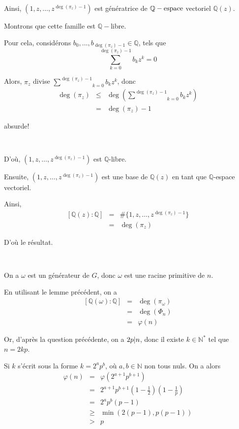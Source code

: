 Ainsi, $(1, z, \ldots, z^{\deg (\pi_z) - 1})$ est g{\'e}n{\'e}ratrice de
$\mathbb{Q}- \operatorname{espace}$ vectoriel $\mathbb{Q} (z)$.

Montrons que cette famille est $\mathbb{Q}-$libre.

Pour cela, consid{\'e}rons $b_0, \ldots, b_{\deg (\pi_z) - 1} \in \mathbb{Q}$,
tels que
\[ \underset{k = 0}{\overset{\deg (\pi_z) - 1}{\sum}} b_k z^k = 0 \]


Alors, $\pi_z$ divise $\underset{k = 0}{\overset{\deg (\pi_z) - 1}{\sum}} b_k
z^k$, donc
\begin{eqnarray*}
  \deg (\pi_z) & \leqslant & \deg \left( \underset{k = 0}{\overset{\deg
  (\pi_z) - 1}{\sum}} b_k z^k \right)\\
  & = & \deg (\pi_z) - 1
\end{eqnarray*}


absurde!

\

D'o{\`u}, $(1, z, \ldots, z^{\deg (\pi_z) - 1})$ est $\mathbb{Q}$-libre.

Ensuite, $(1, z, \ldots, z^{\deg (\pi_z) - 1})$ est une base de $\mathbb{Q}
(z)$ en tant que $\mathbb{Q}$-espace vectoriel.

Ainsi,
\begin{eqnarray*}
  {}[\mathbb{Q} (z) : \mathbb{Q}] & = & \# \{ 1, z, \ldots, z^{\deg (\pi_z) -
  1} \}\\
  & = & \deg (\pi_z)
\end{eqnarray*}


D'o{\`u} le r{\'e}sultat.

\

On a $\omega$ est un g{\'e}n{\'e}rateur de $G$, donc $\omega$ est une racine
primitive de $n$.

En utilisant le lemme pr{\'e}c{\'e}dent, on a
\begin{eqnarray*}
  {}[\mathbb{Q} (\omega) : \mathbb{Q}] & = & \deg (\pi_{\omega})\\
  & = & \deg (\Phi_n)\\
  & = & \varphi (n)
\end{eqnarray*}


Or, d'apr{\`e}s la question pr{\'e}c{\'e}dente, on a $2 p | n $,
donc il existe $k \in \mathbb{N}^{\ast}$ tel que $n = 2 k p$.

Si $k$ s'{\'e}crit sous la forme $k = 2^a p^b$, o{\`u} $a, b \in \mathbb{N}$
non tous nuls. On a alors
\begin{eqnarray*}
  \varphi (n) & = & \varphi (2^{a + 1} p^{b + 1})\\
  & = & 2^{a + 1} p^{b + 1} \left( 1 - \frac{1}{2} \right) \left( 1 -
  \frac{1}{p} \right)\\
  & = & 2^a p^b (p - 1)\\
  & \geqslant & \min (2 (p - 1), p (p - 1))\\
  & > & p
\end{eqnarray*}


